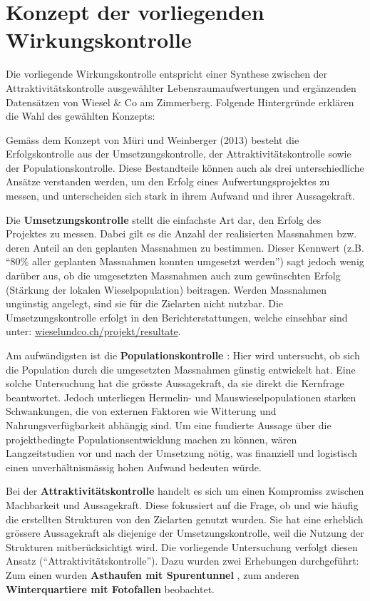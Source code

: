 \documentclass[
  oneside]{scrbook}
\begin{document}
\hypertarget{konzept-der-vorliegenden-wirkungskontrolle}{%
\chapter{Konzept der vorliegenden Wirkungskontrolle}\label{konzept-der-vorliegenden-wirkungskontrolle}}

Die vorliegende Wirkungskontrolle entspricht einer Synthese zwischen der Attraktivitätskontrolle ausgewählter Lebensraumaufwertungen und ergänzenden Datensätzen von Wiesel \& Co am Zimmerberg. Folgende Hintergründe erklären die Wahl des gewählten Konzepts:

Gemäss dem Konzept von Müri und Weinberger (2013) besteht die Erfolgskontrolle aus der Umsetzungskontrolle, der Attraktivitätskontrolle sowie der Populationskontrolle. Diese Bestandteile können auch als drei unterschiedliche Ansätze verstanden werden, um den Erfolg eines Aufwertungsprojektes zu messen, und unterscheiden sich stark in ihrem Aufwand und ihrer Aussagekraft.

Die \textbf{Umsetzungskontrolle} stellt die einfachste Art dar, den Erfolg des Projektes zu messen. Dabei gilt es die Anzahl der realisierten Massnahmen bzw. deren Anteil an den geplanten Massnahmen zu bestimmen. Dieser Kennwert (z.B. ``80\% aller geplanten Massnahmen konnten umgesetzt werden'') sagt jedoch wenig darüber aus, ob die umgesetzten Massnahmen auch zum gewünschten Erfolg (Stärkung der lokalen Wieselpopulation) beitragen. Werden Massnahmen ungünstig angelegt, sind sie für die Zielarten nicht nutzbar. Die Umsetzungskontrolle erfolgt in den Berichterstattungen, welche einsehbar sind unter: \href{http://www.wieselundco.ch/projekt/resultate}{wieselundco.ch/projekt/resultate}.

Am aufwändigsten ist die \textbf{Populationskontrolle} : Hier wird untersucht, ob sich die Population durch die umgesetzten Massnahmen günstig entwickelt hat. Eine solche Untersuchung hat die grösste Aussagekraft, da sie direkt die Kernfrage beantwortet. Jedoch unterliegen Hermelin- und Mauswieselpopulationen starken Schwankungen, die von externen Faktoren wie Witterung und Nahrungsverfügbarkeit abhängig sind. Um eine fundierte Aussage über die projektbedingte Populationsentwicklung machen zu können, wären Langzeitstudien vor und nach der Umsetzung nötig, was finanziell und logistisch einen unverhältnismässig hohen Aufwand bedeuten würde.

Bei der \textbf{Attraktivitätskontrolle} handelt es sich um einen Kompromiss zwischen Machbarkeit und Aussagekraft. Diese fokussiert auf die Frage, ob und wie häufig die erstellten Strukturen von den Zielarten genutzt wurden. Sie hat eine erheblich grössere Aussagekraft als diejenige der Umsetzungskontrolle, weil die Nutzung der Strukturen mitberücksichtigt wird. Die vorliegende Untersuchung verfolgt diesen Ansatz (``Attraktivitätskontrolle''). Dazu wurden zwei Erhebungen durchgeführt: Zum einen wurden \textbf{Asthaufen mit Spurentunnel} , zum anderen \textbf{Winterquartiere mit Fotofallen} beobachtet.
\end{document}
